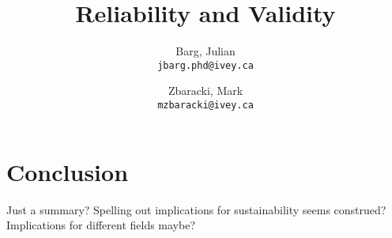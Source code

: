 \documentclass{article}
\title{Reliability and Validity}
\author{
	Barg, Julian\\
	\texttt{jbarg.phd@ivey.ca}
	\and
	Zbaracki, Mark\\
	\texttt{mzbaracki@ivey.ca}
}
\begin{document}
	\maketitle

	

	

	

	

	

	







	\section*{Conclusion}

	Just a summary? Spelling out implications for sustainability seems construed? Implications for different fields maybe?

	\clearpage
	\printbibliography
\end{document}
